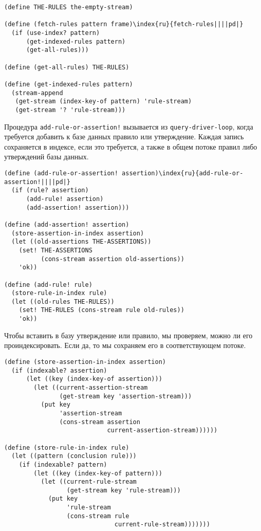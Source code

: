 \begin{Verbatim}[fontsize=\small]
(define THE-RULES the-empty-stream)

(define (fetch-rules pattern frame)\index{ru}{fetch-rules||||pd|}
  (if (use-index? pattern)
      (get-indexed-rules pattern)
      (get-all-rules)))

(define (get-all-rules) THE-RULES)

(define (get-indexed-rules pattern)
  (stream-append
   (get-stream (index-key-of pattern) 'rule-stream)
   (get-stream '? 'rule-stream)))
\end{Verbatim}

Процедура {\tt add-rule-or-assertion!} вызывается
из {\tt query-driver-loop}, когда требуется добавить к базе
данных правило или утверждение.  Каждая запись сохраняется в индексе,
если это требуется, а также в общем потоке правил либо утверждений
базы данных.

\begin{Verbatim}[fontsize=\small]
(define (add-rule-or-assertion! assertion)\index{ru}{add-rule-or-assertion!||||pd|}
  (if (rule? assertion)
      (add-rule! assertion)
      (add-assertion! assertion)))

(define (add-assertion! assertion)
  (store-assertion-in-index assertion)
  (let ((old-assertions THE-ASSERTIONS))
    (set! THE-ASSERTIONS
          (cons-stream assertion old-assertions))
    'ok))

(define (add-rule! rule)
  (store-rule-in-index rule)
  (let ((old-rules THE-RULES))
    (set! THE-RULES (cons-stream rule old-rules))
    'ok))
\end{Verbatim}

Чтобы вставить в базу утверждение или правило, мы
проверяем, можно ли его проиндексировать. Если да, то мы сохраняем его
в соответствующем потоке.

\begin{Verbatim}[fontsize=\small]
(define (store-assertion-in-index assertion)
  (if (indexable? assertion)
      (let ((key (index-key-of assertion)))
        (let ((current-assertion-stream
               (get-stream key 'assertion-stream)))
          (put key
               'assertion-stream
               (cons-stream assertion
                            current-assertion-stream))))))

(define (store-rule-in-index rule)
  (let ((pattern (conclusion rule)))
    (if (indexable? pattern)
        (let ((key (index-key-of pattern)))
          (let ((current-rule-stream
                 (get-stream key 'rule-stream)))
            (put key
                 'rule-stream
                 (cons-stream rule
                              current-rule-stream)))))))
\end{Verbatim}

